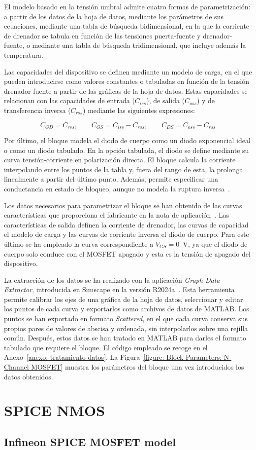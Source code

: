 El modelo basado en la tensión umbral admite cuatro formas de parametrización: a partir de los datos de la hoja de datos, mediante los parámetros de sus ecuaciones, mediante una tabla de búsqueda bidimensional, en la que la corriente de drenador se tabula en función de las tensiones puerta-fuente y drenador-fuente, o mediante una tabla de búsqueda tridimensional, que incluye además la temperatura.

Las capacidades del dispositivo se definen mediante un modelo de carga, en el que pueden introducirse como valores constantes o tabuladas en función de la tensión drenador-fuente a partir de las gráficas de la hoja de datos. Estas capacidades se relacionan con las capacidades de entrada ($C_{iss}$), de salida ($C_{oss}$) y de transferencia inversa ($C_{rss}$) mediante las siguientes expresiones:

\begin{equation}
    C_{GD} = C_{rss}, \qquad C_{GS} = C_{iss} - C_{rss}, \qquad C_{DS} = C_{oss} - C_{rss}
\end{equation}

Por último, el bloque modela el diodo de cuerpo como un diodo exponencial ideal o como un diodo tabulado. En la opción tabulada, el diodo se define mediante su curva tensión-corriente en polarización directa. El bloque calcula la corriente interpolando entre los puntos de la tabla y, fuera del rango de esta, la prolonga linealmente a partir del último punto. Además, permite especificar una conductancia en estado de bloqueo, aunque no modela la ruptura inversa~\cite{MathWorks_NChannelMOSFET}.

Los datos necesarios para parametrizar el bloque se han obtenido de las curvas características que proporciona el fabricante en la nota de aplicación~\cite{infineonAN2017-46}. Las características de salida definen la corriente de drenador, las curvas de capacidad el modelo de carga y las curvas de corriente inversa el diodo de cuerpo. Para este último se ha empleado la curva correspondiente a $V_{GS} = 0$~V, ya que el diodo de cuerpo solo conduce con el MOSFET apagado y esta es la tensión de apagado del dispositivo.

La extracción de los datos se ha realizado con la aplicación \textit{Graph Data Extractor}, introducida en Simscape en la versión R2024a~\cite{MathWorks_GraphDataExtractor}. Esta herramienta permite calibrar los ejes de una gráfica de la hoja de datos, seleccionar y editar los puntos de cada curva y exportarlos como archivos de datos de MATLAB. Los puntos se han exportado en formato \textit{Scattered}, en el que cada curva conserva sus propios pares de valores de abscisa y ordenada, sin interpolarlos sobre una rejilla común. Después, estos datos se han tratado en MATLAB para darles el formato tabulado que requiere el bloque. El código empleado se recoge en el Anexo~\ref{anexo: tratamiento datos}. La Figura~\ref{figure: Block Parameters: N-Channel MOSFET} muestra los parámetros del bloque una vez introducidos los datos obtenidos.

\section{SPICE NMOS}

\subsection{Infineon SPICE MOSFET model}
